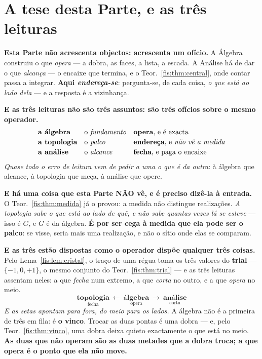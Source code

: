 \documentclass[livro.tex]{subfiles}
\begin{document}
\section{A tese desta Parte, e as três leituras}\label{fis:topo-tese}

\noindent \textbf{Esta Parte não acrescenta objectos: acrescenta um ofício.} A
Álgebra construiu o que \emph{opera} --- a dobra, as faces, a lista, a escada. A
Análise há de dar o que \emph{alcança} --- o encaixe que termina, e o
Teor.~\ref{fis:thm:central}, onde contar passa a integrar. \textbf{Aqui
\emph{endereça-se}}: pergunta-se, de cada coisa, \emph{o que está ao lado dela}
--- e a resposta é a vizinhança.

\medskip\noindent\textbf{E as três leituras não são três assuntos: são três
ofícios sobre o mesmo operador.}
\[
\begin{array}{lll}
\textbf{a álgebra} & \text{o \emph{fundamento}} & \text{\textbf{opera}, e é exacta}\\[2pt]
\textbf{a topologia} & \text{o \emph{palco}} & \text{\textbf{endereça}, e \emph{não vê a medida}}\\[2pt]
\textbf{a análise} & \text{o \emph{alcance}} & \text{\textbf{fecha}, e paga o encaixe}
\end{array}
\]
\emph{Quase todo o erro de leitura vem de pedir a uma o que é da outra}: à
álgebra que alcance, à topologia que meça, à análise que opere.

\medskip\noindent\textbf{E há uma coisa que esta Parte NÃO vê, e é preciso
dizê-la à entrada.} O Teor.~\ref{fis:thm:medida} já o provou: a medida não
distingue realizações. \emph{A topologia sabe o que está ao lado de quê, e não
sabe quantas vezes lá se esteve} --- isso é $G$, e $G$ é da álgebra. \textbf{É
por ser cega à medida que ela pode ser o palco}: se visse, seria mais uma
realização, e não o sítio onde elas se comparam.

\medskip\noindent\textbf{E as três estão dispostas como o operador dispõe
qualquer três coisas.} Pelo Lema~\ref{fis:lem:cristal}, o traço de uma régua
toma os três valores do \textbf{trial} --- $\{-1,0,+1\}$, o mesmo conjunto do
Teor.~\ref{fis:thm:trial} --- e as três leituras assentam neles: a que
\emph{fecha} num extremo, a que \emph{corta} no outro, e a que \emph{opera} no
meio.
\[
\boxed{\;\underset{\text{fecha}}{\textbf{topologia}}\ \longleftarrow\ \underset{\text{opera}}{\textbf{álgebra}}\ \longrightarrow\ \underset{\text{corta}}{\textbf{análise}}\;}
\]
\emph{E as setas apontam para fora, do meio para os lados.} A álgebra não é a
primeira de três em fila: é \textbf{o vinco}. Trocar as duas pontas é uma dobra
--- e, pelo Teor.~\ref{fis:thm:vinco}, uma dobra deixa quieto exactamente o que
está no meio. \textbf{As duas que não operam são as duas metades que a dobra
troca; a que opera é o ponto que ela não move.}
\end{document}
